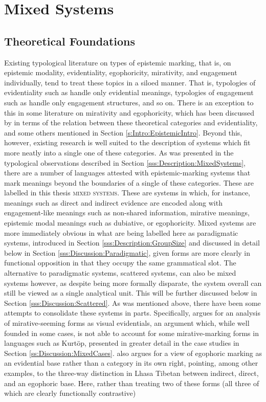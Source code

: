 \section{Mixed Systems}\label{s:Discussion:Mixed}
\subsection{Theoretical Foundations}\label{ss:Discussion:MixedFoundation}
Existing typological literature on types of epistemic marking, that is, on epistemic modality, evidentiality, egophoricity, mirativity, and engagement individually, tend to treat these topics in a siloed manner. That is, typologies of evidentiality such as  handle only evidential meanings, typologies of engagement such as  handle only engagement structures, and so on. There is an exception to this in some literature on mirativity and egophoricity, which has been discussed by  in terms of the relation between these theoretical categories and evidentiality, and some others mentioned in Section \ref{s:Intro:EpistemicIntro}. Beyond this, however, existing research is well suited to the description of systems which fit more neatly into a single one of these categories. As was presented in the typological observations described in Section \ref{sss:Description:MixedSystems}, there are a number of languages attested with epistemic-marking systems that mark meanings beyond the boundaries of a single of these categories. These are labelled in this thesis \textsc{mixed systems}. These are systems in which, for instance, meanings such as direct and indirect evidence are encoded along with engagement-like meanings such as non-shared information, mirative meanings, epistemic modal meanings such as dubiative, or egophoricity. Mixed systems are more immediately obvious in what are being labelled here as paradigmatic systems, introduced in Section \ref{sss:Description:GroupSize} and discussed in detail below in Section \ref{sss:Discussion:Paradigmatic}, given forms are more clearly in functional opposition in that they occupy the same grammatical slot. The alternative to paradigmatic systems, scattered systems, can also be mixed systems however, as despite being more formally disparate, the system overall can still be viewed as a single analytical unit. This will be further discussed below in Section \ref{sss:Discussion:Scattered}. As was mentioned above, there have been some attempts to consolidate these systems in parts. Specifically,  argues for an analysis of mirative-seeming forms as visual evidentials, an argument which, while well founded in some cases, is not able to account for some mirative-marking forms in languages such as Kurtöp, presented in greater detail in the case studies in Section \ref{ss:Discussion:MixedCases}.  also argues for a view of egophoric marking as an evidential base rather than a category in its own right, pointing, among other examples, to the three-way distinction in Lhasa Tibetan between indirect, direct, and an egophoric base. Here, rather than treating two of these forms (all three of which are clearly functionally contrastive) 
